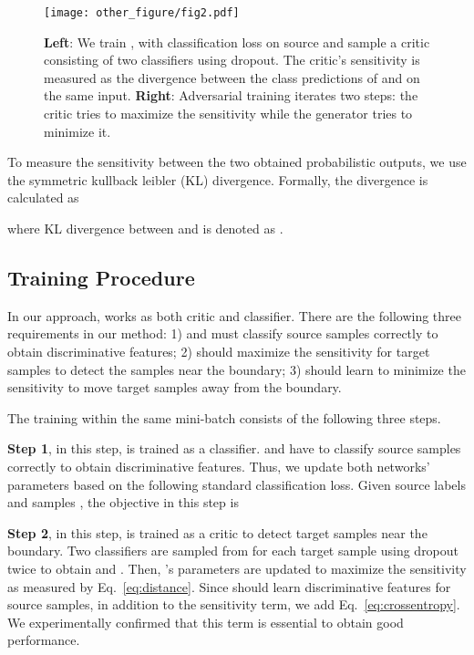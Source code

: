 \documentclass{article} \usepackage{iclr2018_conference,times}
\begin{document}
\begin{figure}[t]
  \begin{center}
\texttt{[image: other\_figure/fig2.pdf]}
  \end{center}
  \vspace{-3mm}
  \caption{ {\small }{\bf Left}: We train ,  with classification loss on source and sample a critic consisting of two classifiers using dropout. The critic's sensitivity is measured as the divergence between the class predictions of  and  on the same input. {\bf Right}: Adversarial training iterates two steps: the critic tries to maximize the sensitivity while the generator tries to minimize it.}
  \label{fig:method_overview}
  \end{figure}

To measure the sensitivity  between the two obtained  probabilistic outputs, we use the symmetric kullback leibler (KL) divergence. Formally, the divergence is calculated as

where KL divergence between  and  is denoted as . 

\subsection{Training Procedure}\label{sec:procedure}
\vspace{-3mm}        
In our approach,  works as both critic and classifier. 
There are the following three requirements in our method:
1)  and  must classify source samples correctly to obtain discriminative features; 2)  should maximize the sensitivity for target samples to detect the samples near the boundary; 3)  should learn to minimize the sensitivity to move target samples away from the boundary.

The training within the same mini-batch consists of the following three steps.

{\bf Step 1}, in this step,  is trained as a classifier.  and  have to classify source samples correctly to obtain discriminative features. Thus, we update both networks' parameters based on the following standard classification loss. 
Given source labels  and samples , the objective in this step is
\newcommand{\mymin}{\mathop{\rm min}\limits}
\newcommand{\mymax}{\mathop{\rm max}\limits}
\newcommand{\1}{\mbox{1}\hspace{-0.25em}\mbox{l}}

{\bf Step 2}, in this step,  is trained as a critic to detect target samples near the boundary. Two classifiers are sampled from  for each target sample using dropout twice to obtain  and . Then, 's parameters are updated to maximize the sensitivity as measured by Eq.~\ref{eq:distance}. Since  should learn discriminative features for source samples, in addition to the sensitivity term, we add  Eq.~\ref{eq:crossentropy}. We experimentally confirmed that this term is essential to obtain good performance.
\end{document}
